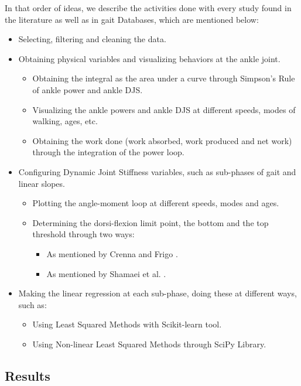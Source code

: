\documentclass[11pt]{article}
\begin{document}
In that order of ideas, we describe the activities done with every study
found in the literature as well as in gait Databases, which are
mentioned below:

\begin{itemize}
\item Selecting, filtering and cleaning the data.
\item Obtaining physical variables and visualizing behaviors at the ankle
joint.
\begin{itemize}
\item Obtaining the integral as the area under a curve through
Simpson's Rule of ankle power and ankle DJS.
\item Visualizing the ankle powers and ankle DJS at different speeds, modes of walking, ages, etc.
\item Obtaining the work done (work absorbed, work produced and net work) through the integration of the power loop.
\end{itemize}
\item Configuring Dynamic Joint Stiffness variables, such as sub-phases of gait and linear slopes. 
\begin{itemize}
\item Plotting the angle-moment loop at different speeds, modes and ages.
\item Determining the dorsi-flexion limit point, the bottom and the top
threshold through two ways:
\begin{itemize}
\item As mentioned by Crenna and Frigo \cite{Crenna2011}.
\item As mentioned by Shamaei et al. \cite{Shamaei2013}.
\end{itemize} 
\end{itemize}
\item Making the linear regression at each sub-phase, doing these at different ways, such as:
\begin{itemize}
\item Using Least Squared Methods with Scikit-learn tool.
\item Using Non-linear Least Squared Methods through SciPy Library.
\end{itemize}
\end{itemize}

    \hypertarget{results}{%
\subsection{Results}\label{results}}
\end{document}
